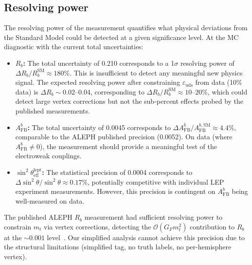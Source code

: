 \documentclass[11pt,a4paper]{article}
\begin{document}
\subsection{Resolving power}
\label{sec:resolving_power}

The resolving power of the measurement quantifies what physical deviations from the
Standard Model could be detected at a given significance level. At the MC diagnostic with the
current total uncertainties:

\begin{itemize}
\item \textbf{$R_b$:} The total uncertainty of 0.210 corresponds to a 1$\sigma$ resolving
power of $\Delta R_b / R_b^\mathrm{SM} \approx 180\%$. This is insufficient to detect
any meaningful new physics signal. The expected resolving power after constraining
$\varepsilon_\mathrm{uds}$ from data (10\% data) is $\Delta R_b \sim 0.02$--0.04,
corresponding to $\Delta R_b / R_b^\mathrm{SM} \approx 10$--$20\%$, which could detect
large vertex corrections but not the sub-percent effects probed by the published
measurements.

\item \textbf{$A_\mathrm{FB}^b$:} The total uncertainty of 0.0045 corresponds to
$\Delta A_\mathrm{FB}^b / A_\mathrm{FB}^{b,\mathrm{SM}} \approx 4.4\%$, comparable
to the ALEPH published precision (0.0052). On data (where $A_\mathrm{FB}^b \neq 0$),
the measurement should provide a meaningful test of the electroweak couplings.

\item \textbf{$\sin^2\theta_\mathrm{eff}^\mathrm{lept}$:} The statistical precision
of 0.0004 corresponds to $\Delta \sin^2\theta / \sin^2\theta \approx 0.17\%$,
potentially competitive with individual LEP experiment measurements. However, this
precision is contingent on $A_\mathrm{FB}^b$ being well-measured on data.
\end{itemize}

The published ALEPH $R_b$ measurement had sufficient resolving power to constrain
$m_t$ via vertex corrections, detecting the $\mathcal{O}(G_F m_t^2)$ contribution
to $R_b$ at the $\sim 0.001$ level~\cite{ALEPH:Rb:1996}. Our simplified analysis
cannot achieve this precision due to the structural limitations (simplified tag,
no truth labels, no per-hemisphere vertex).

\FloatBarrier
{}
\end{document}
